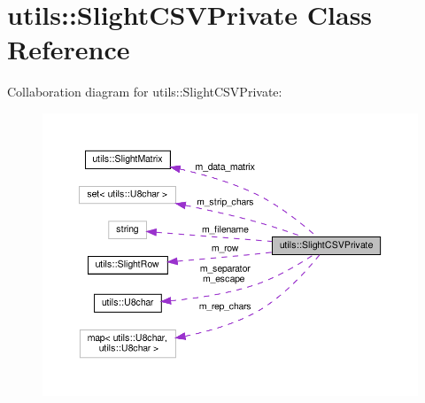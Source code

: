 \hypertarget{classutils_1_1SlightCSVPrivate}{}\section{utils\+:\+:Slight\+C\+S\+V\+Private Class Reference}
\label{classutils_1_1SlightCSVPrivate}


Collaboration diagram for utils\+:\+:Slight\+C\+S\+V\+Private\+:\nopagebreak
\begin{figure}[H]
\begin{center}
\leavevmode
\includegraphics[width=350pt]{classutils_1_1SlightCSVPrivate__coll__graph}
\end{center}
\end{figure}
